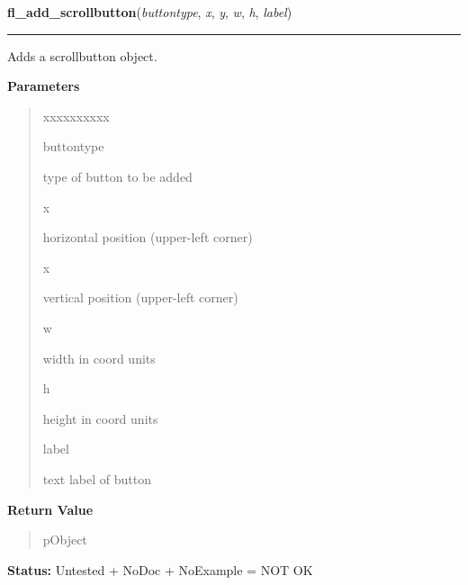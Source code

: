     \label{xformslib:library:fl_add_scrollbutton}

    \vspace{0.5ex}

\hspace{.8\funcindent}\begin{boxedminipage}{\funcwidth}

    \raggedright \textbf{fl\_add\_scrollbutton}(\textit{buttontype}, \textit{x}, \textit{y}, \textit{w}, \textit{h}, \textit{label})

    \vspace{-1.5ex}

    \rule{\textwidth}{0.5\fboxrule}
\setlength{\parskip}{2ex}
    Adds a scrollbutton object.

\setlength{\parskip}{1ex}
      \textbf{Parameters}
      \vspace{-1ex}

      \begin{quote}
        \begin{Ventry}{xxxxxxxxxx}

          \item[buttontype]

          type of button to be added

          \item[x]

          horizontal position (upper-left corner)

          \item[x]

          vertical position (upper-left corner)

          \item[w]

          width in coord units

          \item[h]

          height in coord units

          \item[label]

          text label of button

        \end{Ventry}

      \end{quote}

      \textbf{Return Value}
    \vspace{-1ex}

      \begin{quote}
      pObject

      \end{quote}

\textbf{Status:} Untested + NoDoc + NoExample = NOT OK



    \end{boxedminipage}

